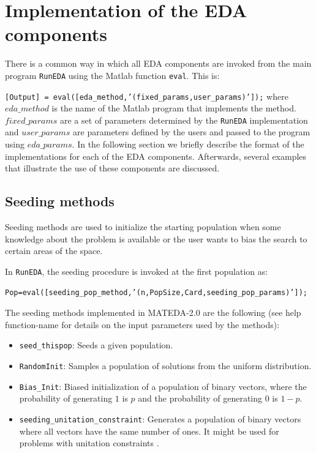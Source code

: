 \documentclass[a4paper]{article}
\begin{document}
\section{Implementation of the EDA components}

There is a common way in which all EDA components are invoked from the main program  \texttt{RunEDA} using the Matlab function \texttt{eval}. This
is:

 \texttt{[Output] = eval([eda\_method,'(fixed\_params,user\_params)']);}
where $eda\_method$ is the name of the Matlab program that implements the
 method. $fixed\_params$ are a set of parameters determined by the
 \texttt{RunEDA} implementation and $user\_params$ are parameters defined by
 the users and passed to the program using $eda\_params$. In the
 following section we briefly describe the format of the
implementations for each of the EDA components. Afterwards, several
examples that illustrate the use of these components are discussed.

\subsection{Seeding methods}

 Seeding methods are used to initialize the starting population when
 some knowledge about the problem is available or the user wants to
 bias the search to certain areas of the space.

In  \texttt{RunEDA}, the seeding procedure is invoked at the first
population as:

\texttt{Pop=eval([seeding\_pop\_method,'(n,PopSize,Card,seeding\_pop\_params)']);}

 The seeding methods implemented in MATEDA-2.0 are the following (see help
function-name for details on the input parameters used by the methods):

\begin{itemize}

 \item \texttt{seed\_thispop}: Seeds a given population.

 \item  \texttt{RandomInit}:  Samples a population of solutions from the uniform
distribution.

\item  \texttt{Bias\_Init}:   Biased initialization of a population of binary vectors,    where the probability of generating $1$ is $p$ and the probability of generating $0$ is $1-p$.

 \item  \texttt{seeding\_unitation\_constraint}:  Generates a population of binary vectors
                               where all vectors have the same number of
                               ones. It might be used for problems
                               with unitation constraints \cite{Santana_and_Ochoa:1999b,Santana_et_al:2001c}.


\end{itemize}
\end{document}
